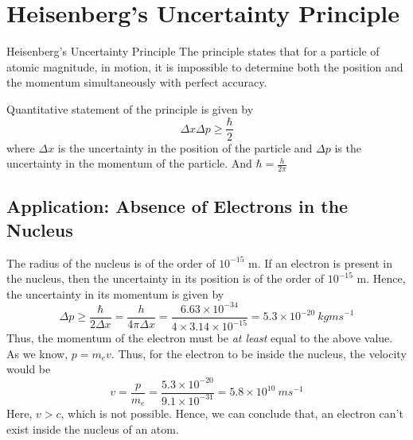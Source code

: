 \documentclass[12pt]{article}
\numberwithin{equation}{subsection}
\begin{document}

\section{Heisenberg's Uncertainty Principle}

\begin{definition}{Heisenberg's Uncertainty Principle}{}
    The principle states that for a particle of atomic magnitude, in motion, it is impossible to determine both the position and the momentum simultaneously with perfect accuracy.
\end{definition}
Quantitative statement of the principle is given by
\begin{equation}
    \boxed{ \Delta x \Delta p \geq \frac{\hbar}{2} }
\end{equation}
where $\Delta x$ is the uncertainty in the position of the particle and $\Delta p$ is the uncertainty in the momentum of the particle. And $\displaystyle \hbar = \frac{h}{2\pi}$ \\

\subsection{Application: Absence of Electrons in the Nucleus}
The radius of the nucleus is of the order of $10^{-15}$ m. If an electron is present in the nucleus, then the uncertainty in its position is of the order of $10^{-15}$ m. Hence, the uncertainty in its momentum is given by \[
    \Delta p \geq \frac{\hbar}{2\Delta x} = \frac{h}{4\pi\Delta x} = \frac{6.63 \times 10^{-34}}{4 \times 3.14 \times 10^{-15}} = 5.3 \times 10^{-20} \: \si{kg m s}^{-1}
\]
Thus, the momentum of the electron must be \textit{at least} equal to the above value. As we know, $p = m_e v$. Thus, for the electron to be inside the nucleus, the velocity would be \[
    v = \frac{p}{m_e} = \frac{5.3 \times 10^{-20}}{9.1 \times 10^{-31}} = 5.8 \times 10^{10} \: \si{m s}^{-1}
\]
Here, $v > c$, which is not possible. Hence, we can conclude that, an electron can't exist inside the nucleus of an atom.
\end{document}
